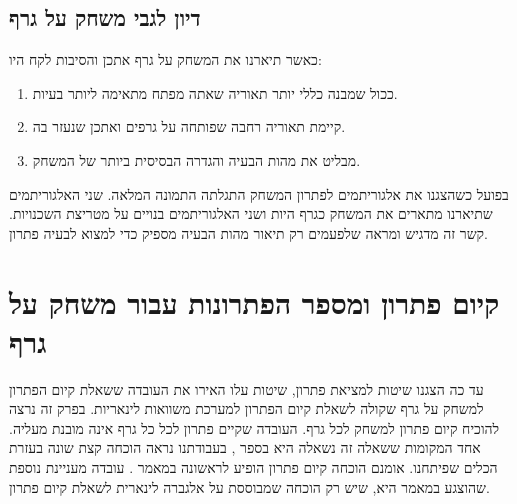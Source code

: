 \documentclass[12pt,leqno]{article}
\theoremstyle{theoremdd}
\begin{document}
\subsection{דיון לגבי משחק על גרף}
כאשר תיארנו את המשחק על גרף אתכן 
והסיבות לקח היו:
\begin{enumerate}
    \item 
    ככול שמבנה כללי יותר תאוריה שאתה מפתח מתאימה ליותר בעיות.
    \item 
    קיימת תאוריה רחבה שפותחה על גרפים ואתכן שנעזר בה.
    \item 
    מבליט את מהות הבעיה והגדרה הבסיסית ביותר של המשחק.
\end{enumerate}
בפועל כשהצגנו את אלגוריתמים לפתרון המשחק 
התגלתה התמונה המלאה.
שני האלגוריתמים שתיארנו מתארים את המשחק כגרף היות ושני האלגוריתמים בנויים על מטריצת השכנויות.
קשר זה מדגיש ומראה שלפעמים רק תיאור מהות הבעיה מספיק כדי למצוא לבעיה פתרון.

\section{קיום פתרון ומספר הפתרונות עבור משחק על גרף}
עד כה הצגנו שיטות למציאת פתרון,
שיטות עלו האירו את העובדה
ששאלת קיום הפתרון למשחק על גרף שקולה לשאלת קיום הפתרון למערכת
משוואות לינאריות.
בפרק זה נרצה להוכיח קיום פתרון למשחק לכל גרף.
העובדה שקיים פתרון לכל כל גרף אינה מובנת מעליה.
אחד המקומות ששאלה זה נשאלה היא בספר 
\cite{B3},
בעבודתנו נראה הוכחה קצת שונה בעזרת הכלים שפיתחנו.
אומנם הוכחה קיום פתרון הופיע לראשונה במאמר 
\cite{Sutner}.
עובדה מעניינת נוספת שהוצגע במאמר היא,
שיש רק הוכחה שמבוססת על אלגברה לינארית
לשאלת קיום פתרון.
\end{document}
